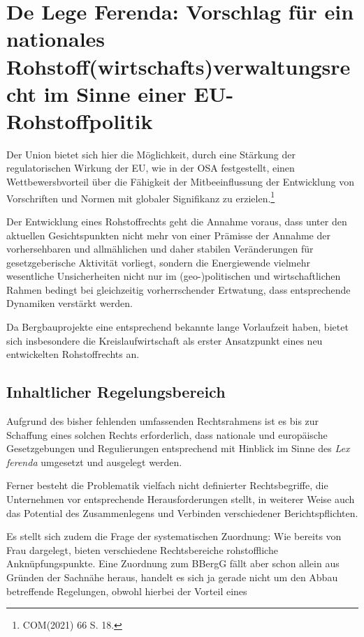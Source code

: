 \documentclass[12pt,a4paper,oneside]{book} %
\begin{document}
	

\section{De Lege Ferenda: Vorschlag für ein nationales Rohstoff(wirtschafts)verwaltungsrecht im Sinne einer EU-Rohstoffpolitik}


Der Union bietet sich hier die Möglichkeit, durch eine Stärkung der regulatorischen Wirkung der EU, wie in der OSA festgestellt, einen Wettbewersbvorteil über die Fähigkeit der Mitbeeinflussung der Entwicklung von Vorschriften und Normen mit globaler Signifikanz zu erzielen.\footnote{COM(2021) 66 S. 18.}

Der Entwicklung eines Rohstoffrechts geht die Annahme voraus, dass unter den aktuellen Gesichtspunkten nicht mehr von einer Prämisse der Annahme der vorhersehbaren und allmählichen und daher stabilen Veränderungen für gesetzgeberische Aktivität vorliegt\autocite{Craig et al, Balancing stability and flexibility in adaptive governance: an analysis of tools available in U.S. environmental law}, sondern die Energiewende vielmehr wesentliche Unsicherheiten nicht nur im (geo-)politischen und wirtschaftlichen Rahmen bedingt bei gleichzeitig vorherrschender Ertwatung, dass entsprechende Dynamiken verstärkt werden.\autocite{bibid}

Da Bergbauprojekte eine entsprechend bekannte lange Vorlaufzeit haben, bietet sich insbesondere die Kreislaufwirtschaft als erster Ansatzpunkt eines neu entwickelten Rohstoffrechts an.

\subsection{Inhaltlicher Regelungsbereich}



Aufgrund des bisher fehlenden umfassenden Rechtsrahmens ist es bis zur Schaffung eines solchen Rechts erforderlich, dass nationale und europäische Gesetzgebungen und Regulierungen entsprechend mit Hinblick im Sinne des \textit{Lex ferenda} umgesetzt und ausgelegt werden. 

Ferner besteht die Problematik vielfach nicht definierter Rechtsbegriffe, die Unternehmen vor entsprechende Herausforderungen stellt, in weiterer Weise auch das Potential des Zusammenlegens und Verbinden verschiedener Berichtspflichten.\autocite{Schäffer, EuZW 2023, 695, 700}

Es stellt sich zudem die Frage der systematischen Zuordnung: Wie bereits von Frau \autocite{frau2023} dargelegt, bieten verschiedene Rechtsbereiche rohstoffliche Anknüpfungspunkte. Eine Zuordnung zum BBergG fällt aber schon allein aus Gründen der Sachnähe heraus, handelt es sich ja gerade nicht um den Abbau betreffende Regelungen, obwohl hierbei der Vorteil eines
\end{document}
